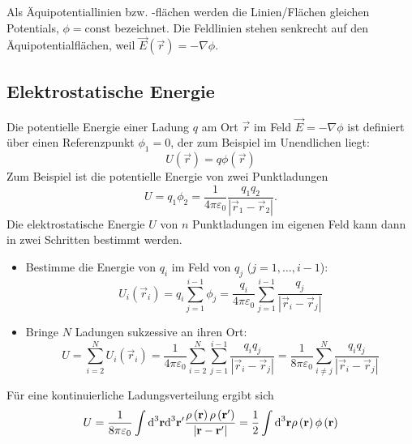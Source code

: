Als Äquipotentiallinien bzw. -flächen werden die Linien/Flächen gleichen Potentials, $\phi =\text{const}$ bezeichnet. Die Feldlinien stehen senkrecht auf den Äquipotentialflächen, weil $\vec {E}\left(\vec {r}\right)=-\nabla \phi $.

\subsection{Elektrostatische Energie\label{ref-023}}

Die potentielle Energie einer Ladung $q$ am Ort $\vec {r}$ im Feld $\vec {E}=-\nabla \phi $ ist definiert über einen Referenzpunkt $\phi _{1}=0$, der zum Beispiel im Unendlichen liegt:
\begin{equation}
	\label{3.11}
	U\left(\vec {r}\right)=q\phi \left(\vec {r}\right)
\end{equation}
Zum Beispiel ist die potentielle Energie von zwei Punktladungen
\begin{equation*}
	U=q_{1}\phi _{2}=\frac{1}{4\pi \varepsilon _{0}}\frac{q_{1}q_{2}}{\left| \vec {r}_{1}-\vec {r}_{2}\right| }.
\end{equation*}
Die elektrostatische Energie $U$ von $n$ Punktladungen im eigenen Feld kann dann in zwei Schritten bestimmt werden.
\begin{itemize}
	\item Bestimme die Energie von $q_{i}$ im Feld von $q_{j}$ ($j=1,\ldots ,i-1$):
	      \begin{equation*}
		      U_{i}\left(\vec {r}_{i}\right)=q_{i}\sum _{j=1}^{i-1}\phi _{j}=\frac{q_{i}}{4\pi \varepsilon _{0}}\sum _{j=1}^{i-1}\frac{q_{j}}{\left| \vec {r}_{i}-\vec {r}_{j}\right| }
	      \end{equation*}
	\item Bringe $N$ Ladungen sukzessive an ihren Ort:
	      \begin{equation*}
		      U=\sum _{i=2}^{N}U_{i}\left(\vec {r}_{i}\right)=\frac{1}{4\pi \varepsilon _{0}}\sum _{i=2}^{N}\sum _{j=1}^{i-1}\frac{q_{i}q_{j}}{\left| \vec {r}_{i}-\vec {r}_{j}\right| }=\frac{1}{8\pi \varepsilon _{0}}\sum _{i\neq j}^{N}\frac{q_{i}q_{j}}{\left| \vec {r}_{i}-\vec {r}_{j}\right| }
	      \end{equation*}

\end{itemize}
Für eine kontinuierliche Ladungsverteilung ergibt sich
\begin{equation*}
	U=\frac{1}{8\pi \varepsilon _{0}}\int \text{d} ^{3}\mathbf{r}\text{d} ^{3}\mathbf{r}'\frac{\rho \left(\mathbf{r}\right)\rho \left(\mathbf{r}'\right)}{\left| \mathbf{r}-\mathbf{r}'\right| }=\frac{1}{2}\int \text{d} ^{3}\mathbf{r}\rho \left(\mathbf{r}\right)\phi \left(\mathbf{r}\right)
\end{equation*}
